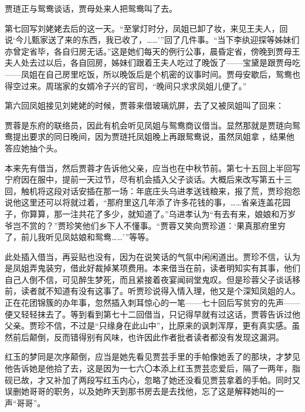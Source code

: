 \par 贾琏正与鸳鸯谈话，贾母处来人把鸳鸯叫了去。
\par 第七回写刘姥姥去后的这一天。“至掌灯时分，凤姐已卸了妆，来见王夫人，回说‘今儿甄家送了来的东西，我已收了，……'”回了几件事。“当下李纨迎探等姊妹们亦曾定省毕，各自归房无话。”这是她们每天的例行公事，晨昏定省，傍晚到贾母王夫人处去过以后，各自回房，姊妹们跟着王夫人吃过了晚饭了——宝黛是跟贾母吃——凤姐在自己房里吃饭，所以晚饭后是个机密的议事时间。贾母安歇后，鸳鸯也得空过来。周瑞家的女婿冷子兴的官司，“晚间只求求凤姐儿便了。”
\par 第六回凤姐接见刘姥姥的时候，贾蓉来借玻璃炕屏，去了又被凤姐叫了回来：
\par 贾蓉是东府的联络员，因此有机会听见凤姐与鸳鸯商议借当。显然那就是贾琏向鸳鸯提出要求的同日晚间，因为贾琏托凤姐晚上再跟鸳鸯说，虽然凤姐拿𫏋，结果他答应她抽个头。
\par 本来先有借当，然后贾蓉才告诉他父亲，应当也在中秋节前。第七十五回上半回写宁府因在服中，提前一天过节，尽有机会插入父子谈话。大概后来改写第五十三回，触机将这段对话安插在那一场：年底庄头乌进孝送钱粮来，报了荒，贾珍抱怨说他这里还可以将就过着，“那府里这几年添了许多花钱的事，……省亲连盖花园子，你算算，那一注共花了多少，就知道了。”乌进孝认为“有去有来，娘娘和万岁爷岂不赏的？”贾珍笑他们乡下人不懂事。“贾蓉又笑向贾珍道：‘果真那府里穷了，前儿我听见凤姑娘和鸳鸯……'”等等。
\par 此处插入借当，再妥贴也没有，因为在说笑话的气氛中闲闲道出。贾珍不信，认为是凤姐弄鬼装穷，借此好裁掉某项费用。本来借当在前，读者明知实有其事，他们自己人倒不信，可见醉生梦死，而且紧接着夜宴闻祠堂鬼叹。但是珍蓉父子谈话移前，读者就不知道有没有这事了。听贾珍说得入情入理，他又是个深知凤姐的人。正在花团锦簇的办年事，忽然插入刺耳惊心的一笔——七十回后写贫穷的先声——便又轻轻抹去了。等到看到第七十二回借当，只记得早就有过这话，贾蓉告诉过他父亲。贾珍不信，不过是“只缘身在此山中”，比原来的讽刺浑厚，更有真实感。虽然前后颠倒，反而错得别有风味，也许因此作者批者读者都没有发现这漏洞。
\par 红玉的梦同是次序颠倒，应当是她先看见贾芸手里的手帕像她丢了的那块，才梦见他告诉她是他拾了去，这是因为一七六〇本添上红玉贾芸恋爱后，隔了一两年，脂砚已故，才又补加了两段写红玉内心，忽略了她还没看见贾芸拿着的手帕。同时又误删她哥哥的职务，以及她昨天到那书房去是去找他，忘了这是解释她叫的一声“哥哥”。
